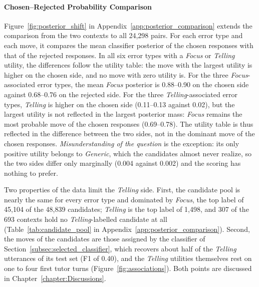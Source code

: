     \paragraph{Chosen--Rejected Probability Comparison}
    Figure~\ref{fig:posterior_shift} in Appendix~\ref{app:posterior_comparison} extends the comparison from the two contexts to all 24,298 pairs. For each error type and each move, it compares the mean classifier posterior of the chosen responses with that of the rejected responses. In all six error types with a \textit{Focus} or \textit{Telling} utility, the differences follow the utility table: the move with the largest utility is higher on the chosen side, and no move with zero utility is. For the three \textit{Focus}-associated error types, the mean \textit{Focus} posterior is 0.88--0.90 on the chosen side against 0.68--0.76 on the rejected side. For the three \textit{Telling}-associated error types, \textit{Telling} is higher on the chosen side (0.11--0.13 against 0.02), but the largest utility is not reflected in the largest posterior mass: \textit{Focus} remains the most probable move of the chosen responses (0.69--0.78). The utility table is thus reflected in the difference between the two sides, not in the dominant move of the chosen responses. \textit{Misunderstanding of the question} is the exception: its only positive utility belongs to \textit{Generic}, which the candidates almost never realize, so the two sides differ only marginally (0.004 against 0.002) and the scoring has nothing to prefer.

    Two properties of the data limit the \textit{Telling} side. First, the candidate pool is nearly the same for every error type and dominated by \textit{Focus}, the top label of 45,104 of the 48,839 candidates; \textit{Telling} is the top label of 1,498, and 307 of the 693 contexts hold no \textit{Telling}-labelled candidate at all (Table~\ref{tab:candidate_pool} in Appendix~\ref{app:posterior_comparison}). Second, the moves of the candidates are those assigned by the classifier of Section~\ref{subsec:selected_classifier}, which recovers about half of the \textit{Telling} utterances of its test set (F1 of 0.40), and the \textit{Telling} utilities themselves rest on one to four first tutor turns (Figure~\ref{fig:associations}). Both points are discussed in Chapter~\ref{chapter:Discussions}.

